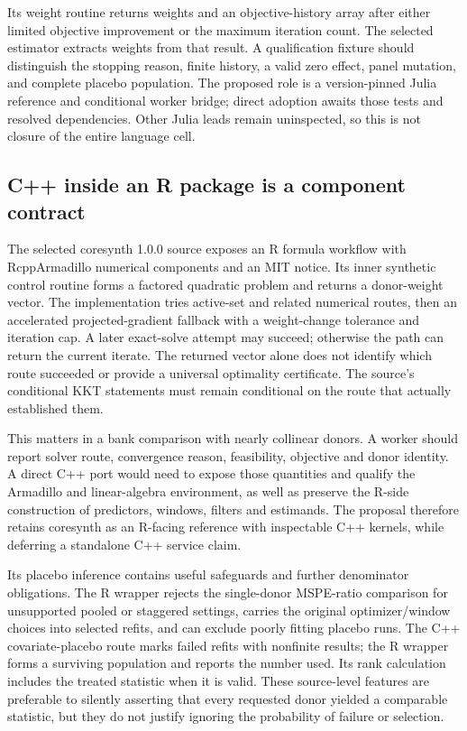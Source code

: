 Its weight routine returns weights and an objective-history array after
either limited objective improvement or the maximum iteration count.
The selected estimator extracts weights from that result. A qualification
fixture should distinguish the stopping reason, finite history, a valid
zero effect, panel mutation, and complete placebo population. The proposed
role is a version-pinned Julia reference and conditional worker bridge;
direct adoption awaits those tests and resolved dependencies. Other Julia
leads remain uninspected, so this is not closure of the entire language cell.
\citep{exec25_synthcross_julia,exec25_synthcross_choice}

\subsection{C++ inside an R package is a component contract}
The selected coresynth 1.0.0 source exposes an R formula workflow with
RcppArmadillo numerical components and an MIT notice. Its inner synthetic
control routine forms a factored quadratic problem and returns a donor-weight
vector. The implementation tries active-set and related numerical routes,
then an accelerated projected-gradient fallback with a weight-change
tolerance and iteration cap. A later exact-solve attempt may succeed;
otherwise the path can return the current iterate. The returned vector alone
does not identify which route succeeded or provide a universal optimality
certificate. The source's conditional KKT statements must remain conditional
on the route that actually established them.~\citep{exec25_synthcross_core}

This matters in a bank comparison with nearly collinear donors. A worker
should report solver route, convergence reason, feasibility, objective and
donor identity. A direct C++ port would need to expose those quantities and
qualify the Armadillo and linear-algebra environment, as well as preserve
the R-side construction of predictors, windows, filters and estimands.
The proposal therefore retains coresynth as an R-facing reference with
inspectable C++ kernels, while deferring a standalone C++ service claim.
\citep{exec25_synthcross_core,exec25_synthcross_choice}

Its placebo inference contains useful safeguards and further denominator
obligations. The R wrapper rejects the single-donor MSPE-ratio comparison
for unsupported pooled or staggered settings, carries the original
optimizer/window choices into selected refits, and can exclude poorly
fitting placebo runs. The C++ covariate-placebo route marks failed refits
with nonfinite results; the R wrapper forms a surviving population and
reports the number used. Its rank calculation includes the treated statistic
when it is valid. These source-level features are preferable to silently
asserting that every requested donor yielded a comparable statistic, but
they do not justify ignoring the probability of failure or selection.
\citep{exec25_synthcross_core}

